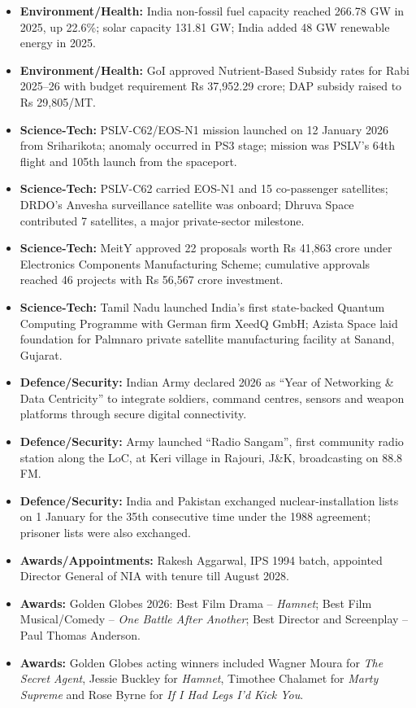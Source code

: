 \documentclass[10pt,a4paper]{article}
\begin{document}
\begin{itemize}
    \item \textbf{Environment/Health:} India non-fossil fuel capacity reached 266.78 GW in 2025, up 22.6\%; solar capacity 131.81 GW; India added 48 GW renewable energy in 2025.
    \item \textbf{Environment/Health:} GoI approved Nutrient-Based Subsidy rates for Rabi 2025--26 with budget requirement Rs 37,952.29 crore; DAP subsidy raised to Rs 29,805/MT.
    \item \textbf{Science-Tech:} PSLV-C62/EOS-N1 mission launched on 12 January 2026 from Sriharikota; anomaly occurred in PS3 stage; mission was PSLV's 64th flight and 105th launch from the spaceport.
    \item \textbf{Science-Tech:} PSLV-C62 carried EOS-N1 and 15 co-passenger satellites; DRDO's Anvesha surveillance satellite was onboard; Dhruva Space contributed 7 satellites, a major private-sector milestone.
    \item \textbf{Science-Tech:} MeitY approved 22 proposals worth Rs 41,863 crore under Electronics Components Manufacturing Scheme; cumulative approvals reached 46 projects with Rs 56,567 crore investment.
    \item \textbf{Science-Tech:} Tamil Nadu launched India's first state-backed Quantum Computing Programme with German firm XeedQ GmbH; Azista Space laid foundation for Palmnaro private satellite manufacturing facility at Sanand, Gujarat.
    \item \textbf{Defence/Security:} Indian Army declared 2026 as ``Year of Networking \& Data Centricity'' to integrate soldiers, command centres, sensors and weapon platforms through secure digital connectivity.
    \item \textbf{Defence/Security:} Army launched ``Radio Sangam'', first community radio station along the LoC, at Keri village in Rajouri, J\&K, broadcasting on 88.8 FM.
    \item \textbf{Defence/Security:} India and Pakistan exchanged nuclear-installation lists on 1 January for the 35th consecutive time under the 1988 agreement; prisoner lists were also exchanged.
    \item \textbf{Awards/Appointments:} Rakesh Aggarwal, IPS 1994 batch, appointed Director General of NIA with tenure till August 2028.
    \item \textbf{Awards:} Golden Globes 2026: Best Film Drama -- \textit{Hamnet}; Best Film Musical/Comedy -- \textit{One Battle After Another}; Best Director and Screenplay -- Paul Thomas Anderson.
    \item \textbf{Awards:} Golden Globes acting winners included Wagner Moura for \textit{The Secret Agent}, Jessie Buckley for \textit{Hamnet}, Timothee Chalamet for \textit{Marty Supreme} and Rose Byrne for \textit{If I Had Legs I'd Kick You}.

\end{itemize}
\end{document}
